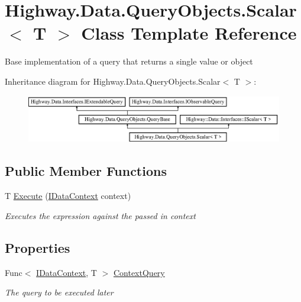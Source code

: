 \hypertarget{class_highway_1_1_data_1_1_query_objects_1_1_scalar-g}{\section{Highway.\-Data.\-Query\-Objects.\-Scalar$<$ T $>$ Class Template Reference}
\label{class_highway_1_1_data_1_1_query_objects_1_1_scalar-g}
}


Base implementation of a query that returns a single value or object  


Inheritance diagram for Highway.\-Data.\-Query\-Objects.\-Scalar$<$ T $>$\-:\begin{figure}[H]
\begin{center}
\leavevmode
\includegraphics[height=2.089552cm]{class_highway_1_1_data_1_1_query_objects_1_1_scalar-g}
\end{center}
\end{figure}
\subsection*{Public Member Functions}
\begin{DoxyCompactItemize}
\item 
T \hyperlink{class_highway_1_1_data_1_1_query_objects_1_1_scalar-g_aff12d516dd21701d1f48c9fb370c5683}{Execute} (\hyperlink{interface_highway_1_1_data_1_1_interfaces_1_1_i_data_context}{I\-Data\-Context} context)
\begin{DoxyCompactList}\small\item\em Executes the expression against the passed in context \end{DoxyCompactList}\end{DoxyCompactItemize}
\subsection*{Properties}
\begin{DoxyCompactItemize}
\item 
Func$<$ \hyperlink{interface_highway_1_1_data_1_1_interfaces_1_1_i_data_context}{I\-Data\-Context}, T $>$ \hyperlink{class_highway_1_1_data_1_1_query_objects_1_1_scalar-g_acb183b773f6c4bb8c9a989c1144095db}{Context\-Query}
\begin{DoxyCompactList}\small\item\em The query to be executed later \end{DoxyCompactList}\end{DoxyCompactItemize}
